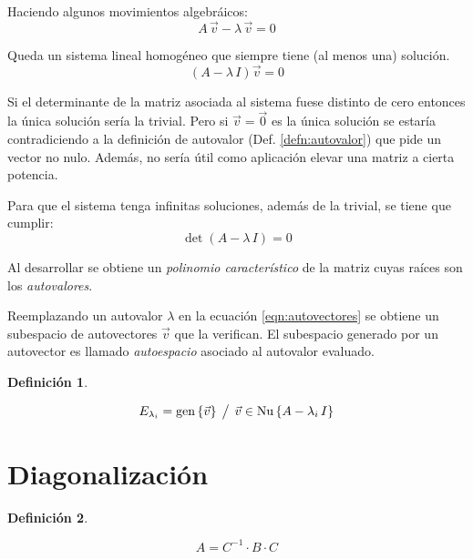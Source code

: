 \documentclass[a5paper,12pt,twoside]{book}
\newtheorem{defn}{{Definición}}[chapter]
\begin{document}
Haciendo algunos movimientos algebráicos:
\begin{equation*}
    A \, \Vec{v} - \lambda \, \Vec{v} = 0
\end{equation*}

Queda un sistema lineal homogéneo que siempre tiene (al menos una) solución.
\begin{equation}
    \left( A - \lambda \, I \right) \Vec{v} = 0
    \label{eqn:autovectores}
\end{equation}

Si el determinante de la matriz asociada al sistema fuese distinto de cero entonces la única solución sería la trivial. Pero si $\Vec{v}=\Vec{0}$ es la única solución se estaría contradiciendo a la definición de autovalor (Def. \ref{defn:autovalor}) que pide un vector no nulo. Además, no sería útil como aplicación elevar una matriz a cierta potencia.

Para que el sistema tenga infinitas soluciones, además de la trivial, se tiene que cumplir:
\begin{equation*}
    \operatorname{det} \left( A - \lambda \, I \right) = 0
\end{equation*}

Al desarrollar se obtiene un \emph{polinomio característico} de la matriz cuyas raíces son los \emph{autovalores}.

Reemplazando un autovalor $\lambda$ en la ecuación \ref{eqn:autovectores} se obtiene un subespacio de autovectores $\Vec{v}$ que la verifican. El subespacio generado por un autovector es llamado \emph{autoespacio} asociado al autovalor evaluado.

\begin{mdframed}[style=MyFrame1]
    \begin{defn}
    \end{defn}
    \begin{equation*}
        E_{\lambda_i} = \operatorname{gen} { \left\{ {\Vec{v}} \right\} } \hspace{1ex} \big/ \hspace{1ex} \Vec{v} \in \operatorname{Nu} { \left\{ {A - \lambda_i \, I} \right\} }
    \end{equation*}
\end{mdframed}


\section{Diagonalización}

\begin{mdframed}[style=MyFrame1]
    \begin{defn}
    \end{defn}
    \begin{equation*}
        A = C^{-1} \cdot B \cdot C
    \end{equation*}
\end{mdframed}
\end{document}
